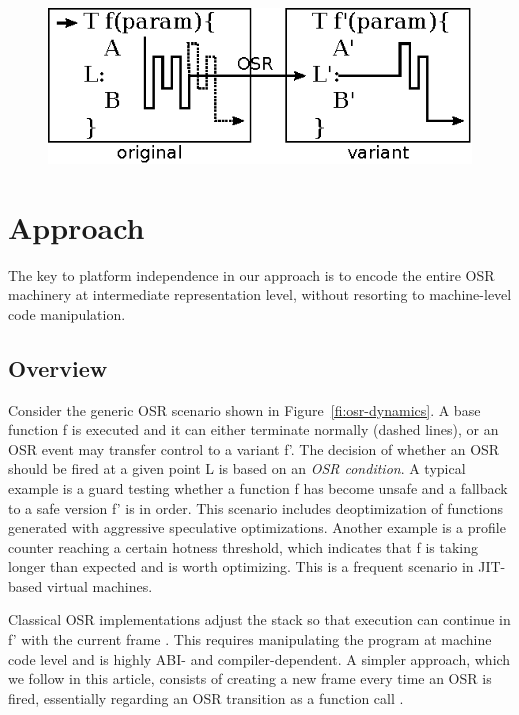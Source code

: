 
\ifdefined\noauthorea
\begin{figure}[t]
\begin{center}
\includegraphics[width=0.6\columnwidth]{figures/overview-osr/overview-osr.eps}
\caption{\protect}
\end{center}
\end{figure}
\fi

\section{Approach}
\label{se:approach}

The key to platform independence in our approach is to encode the entire OSR machinery at intermediate representation level, without resorting to machine-level code manipulation.

\subsection{Overview}
\label{ss:overview}

Consider the generic OSR scenario shown in Figure~\ref{fi:osr-dynamics}. A base function \textsf{f} is executed and it can either terminate normally (dashed lines), or an OSR event may transfer control to a variant \textsf{f'}. The decision of whether an OSR should be fired at a given point \textsf{L} is based on an {\em OSR condition}. A typical example is a guard testing whether a function \textsf{f} has become unsafe and a fallback to a safe version \textsf{f'} is in order. This scenario includes deoptimization of functions generated with aggressive speculative optimizations. Another example is a profile counter reaching a certain hotness threshold, which indicates that \textsf{f} is taking longer than expected and is worth optimizing. This is a frequent scenario in JIT-based virtual machines.

Classical OSR implementations adjust the stack so that execution can continue in \textsf{f'} with the current frame . This requires manipulating the program at machine code level and is highly ABI- and compiler-dependent. A simpler approach, which we follow in this article, consists of creating a new frame every time an OSR is fired, essentially regarding an OSR transition as a function call . 

